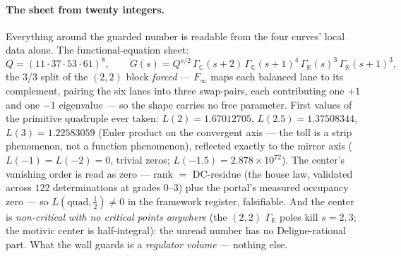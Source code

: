 \documentclass[11pt]{article}
\theoremstyle{definition}
\theoremstyle{remark}
\begin{document}
\paragraph{The sheet from twenty integers.} Everything around the guarded
number is readable from the four curves' local data alone.
The functional-equation sheet:
\[
  Q=(11\cdot37\cdot53\cdot61)^8,\qquad
  G(s)=Q^{s/2}\,\Gamma_{\mathbb C}(s+2)\,\Gamma_{\mathbb C}(s+1)^4\,
  \Gamma_{\mathbb R}(s)^3\,\Gamma_{\mathbb R}(s+1)^3,
\]
the $3/3$ split of the $(2,2)$ block \emph{forced} --- $F_\infty$ maps each
balanced lane to its complement, pairing the six lanes into three swap-pairs,
each contributing one $+1$ and one $-1$ eigenvalue --- so the shape carries no
free parameter. First values of the primitive quadruple ever taken:
$L(2)=1.67012705$, $L(2.5)=1.37508344$, $L(3)=1.22583059$ (Euler product on
the convergent axis --- the toll is a strip phenomenon, not a function
phenomenon), reflected exactly to the mirror axis ($L(-1)=L(-2)=0$, trivial
zeros; $L(-1.5)=2.878\times10^{72}$). The center's vanishing order is read as
zero --- rank $=$ DC-residue (the house law, validated across
$122$ determinations at grades $0$--$3$) plus the portal's measured occupancy
zero --- so $L(\mathrm{quad},\tfrac12)\ne0$ in the framework register,
falsifiable. And the center is \emph{non-critical with no critical points
anywhere} (the $(2,2)$ $\Gamma_{\mathbb R}$ poles kill $s=2,3$; the motivic
center is half-integral): the unread number has no Deligne-rational part.
What the wall guards is a \emph{regulator volume} --- nothing else.
\end{document}
